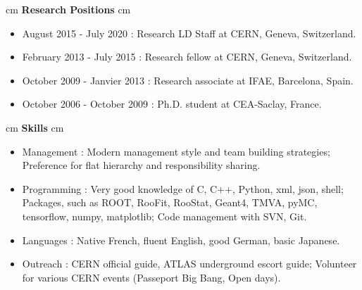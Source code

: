 \documentclass[12pt]{article}
\begin{document}




 cm
{\bf \large Research Positions}
 cm
\TabPositions{5.4cm}
\begin{itemize}
\itemsep0em
\item[] August 2015 - July 2020  \tab : Research LD Staff at CERN, Geneva, Switzerland.
\item[] February 2013 - July 2015  \tab : Research fellow at CERN, Geneva, Switzerland.
\item[] October 2009 - Janvier 2013 \tab : Research associate at IFAE, Barcelona, Spain.
\item[] October 2006 - October 2009 \tab : Ph.D. student at CEA-Saclay, France.
\end{itemize}



 cm
{\bf \large Skills}
 cm
\TabPositions{3.2cm}
\begin{itemize}
\itemsep0.3em
\item[] Management : \tab Modern management style and team building strategies;
 \tab  \tab Preference for flat hierarchy and responsibility sharing.
 
\item[] Programming : \tab Very good knowledge of C, C++, Python, xml, json, shell;
 \tab  \tab Packages, such as ROOT, RooFit, RooStat, Geant4, TMVA, pyMC, 
  \tab  \tab tensorflow, numpy, matplotlib;
 \tab  \tab  Code management with SVN, Git.
 
 \item[] Languages : \tab Native French, fluent English, good German, basic Japanese.
 
  \item[] Outreach : \tab  CERN official guide, ATLAS underground escort guide;
 \tab  \tab  Volunteer for various CERN events (Passeport Big Bang, Open days).
\end{itemize}
\end{document}
